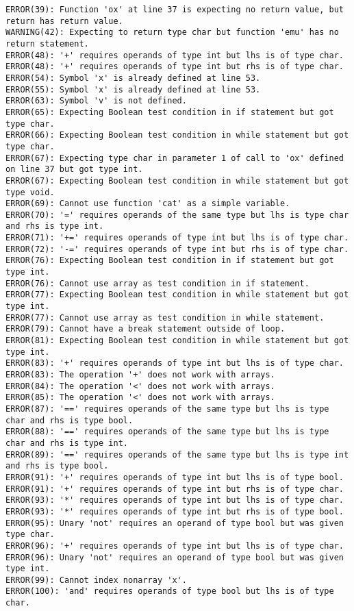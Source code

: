 \documentclass[12pt]{book}
\begin{document}
\begin{lstlisting}
ERROR(39): Function 'ox' at line 37 is expecting no return value, but return has return value.
WARNING(42): Expecting to return type char but function 'emu' has no return statement.
ERROR(48): '+' requires operands of type int but lhs is of type char.
ERROR(48): '+' requires operands of type int but rhs is of type char.
ERROR(54): Symbol 'x' is already defined at line 53.
ERROR(55): Symbol 'x' is already defined at line 53.
ERROR(63): Symbol 'v' is not defined.
ERROR(65): Expecting Boolean test condition in if statement but got type char.
ERROR(66): Expecting Boolean test condition in while statement but got type char.
ERROR(67): Expecting type char in parameter 1 of call to 'ox' defined on line 37 but got type int.
ERROR(67): Expecting Boolean test condition in while statement but got type void.
ERROR(69): Cannot use function 'cat' as a simple variable.
ERROR(70): '=' requires operands of the same type but lhs is type char and rhs is type int.
ERROR(71): '+=' requires operands of type int but lhs is of type char.
ERROR(72): '-=' requires operands of type int but rhs is of type char.
ERROR(76): Expecting Boolean test condition in if statement but got type int.
ERROR(76): Cannot use array as test condition in if statement.
ERROR(77): Expecting Boolean test condition in while statement but got type int.
ERROR(77): Cannot use array as test condition in while statement.
ERROR(79): Cannot have a break statement outside of loop.
ERROR(81): Expecting Boolean test condition in while statement but got type int.
ERROR(83): '+' requires operands of type int but lhs is of type char.
ERROR(83): The operation '+' does not work with arrays.
ERROR(84): The operation '<' does not work with arrays.
ERROR(85): The operation '<' does not work with arrays.
ERROR(87): '==' requires operands of the same type but lhs is type char and rhs is type bool.
ERROR(88): '==' requires operands of the same type but lhs is type char and rhs is type int.
ERROR(89): '==' requires operands of the same type but lhs is type int and rhs is type bool.
ERROR(91): '+' requires operands of type int but lhs is of type bool.
ERROR(91): '+' requires operands of type int but rhs is of type char.
ERROR(93): '*' requires operands of type int but lhs is of type char.
ERROR(93): '*' requires operands of type int but rhs is of type bool.
ERROR(95): Unary 'not' requires an operand of type bool but was given type char.
ERROR(96): '+' requires operands of type int but lhs is of type char.
ERROR(96): Unary 'not' requires an operand of type bool but was given type int.
ERROR(99): Cannot index nonarray 'x'.
ERROR(100): 'and' requires operands of type bool but lhs is of type char.

\end{lstlisting}
\end{document}
